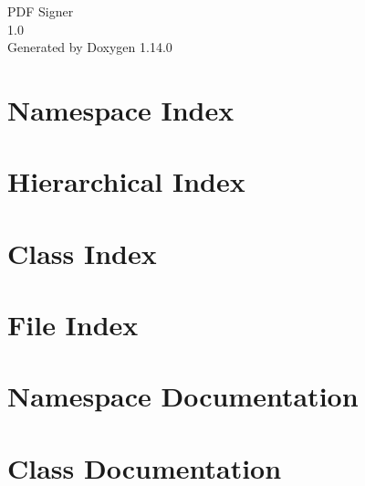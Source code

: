 \documentclass[twoside]{book}
\newcommand{\+}{\discretionary{\mbox{\scriptsize$\hookleftarrow$}}{}{}}
\newcommand{\clearemptydoublepage}{%
    \newpage{\pagestyle{empty}\cleardoublepage}%
  }
\begin{document}
  \raggedbottom
    \hypersetup{pageanchor=false,
                bookmarksnumbered=true,
                pdfencoding=unicode
               }
  \begin{titlepage}
  \vspace*{7cm}
  \begin{center}%
  {\Large PDF Signer}\\
  [1ex]\large 1.\+0 \\
  \vspace*{1cm}
  {\large Generated by Doxygen 1.14.0}\\
  \end{center}
  \end{titlepage}
  \clearemptydoublepage
  \tableofcontents
  \clearemptydoublepage
  \hypersetup{pageanchor=true}
\chapter{Namespace Index}

\chapter{Hierarchical Index}

\chapter{Class Index}

\chapter{File Index}

\chapter{Namespace Documentation}


\chapter{Class Documentation}







\end{document}

